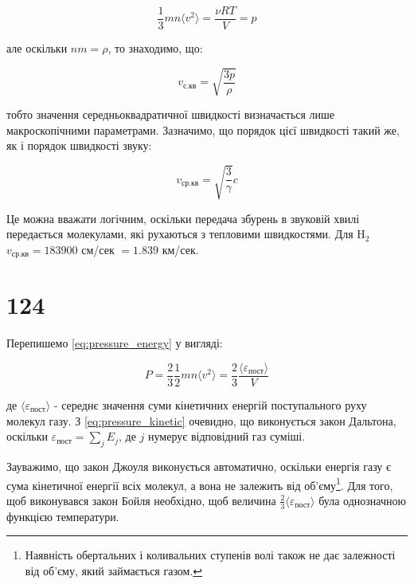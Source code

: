 \begin{equation}\label{eq:pressure_ideal_gas}
\frac{1}{3}mn\langle v^{2} \rangle = \frac{\nu RT}{V} = p
\end{equation}

але оскільки $nm = \rho$, то знаходимо, що:

\begin{equation}\label{eq:rms_velocity}
v_{\text{с.кв}} = \sqrt{\frac{3p}{\rho}}
\end{equation}

тобто значення середньоквадратичної швидкості визначається лише макроскопічними параметрами.
Зазначимо, що порядок цієї швидкості такий же, як і порядок швидкості звуку:

\begin{equation}\label{eq:sound_velocity}
v_{\text{ср.кв}} = \sqrt{\frac{3}{\gamma}}c
\end{equation}

Це можна вважати логічним, оскільки передача збурень в звуковій хвилі передається молекулами, які
рухаються з тепловими швидкостями. Для $\text{H}_2$ $v_{\text{ср.кв}} = 183900$ см/сек $= 1.839$
км/сек.


\section{124}

Перепишемо \eqref{eq:pressure_energy} у вигляді:

\begin{equation}\label{eq:pressure_kinetic}
P = \frac{2}{3}\frac{1}{2}mn\langle v^{2} \rangle = \frac{2}{3}\frac{\langle \varepsilon_{\text{пост}}
\rangle}{V}
\end{equation}

де $\langle \varepsilon_{\text{пост}} \rangle$ - середнє значення суми кінетичних енергій
поступального руху молекул газу. З \eqref{eq:pressure_kinetic} очевидно, що виконується закон
Дальтона, оскільки $\varepsilon_{\text{пост}} = \sum_{j}E_{j}$, де $j$ нумерує відповідний газ суміші.

Зауважимо, що закон Джоуля виконується автоматично, оскільки енергія газу є сума кінетичної енергії
всіх молекул, а вона не залежить від об'єму\footnote{Наявність обертальних і коливальних ступенів волі
також не дає залежності від об'єму, який займається газом.}. Для того, щоб виконувався закон Бойля
необхідно, щоб величина $\frac{2}{3}\langle \varepsilon_{\text{пост}} \rangle$ була однозначною
функцією температури.

